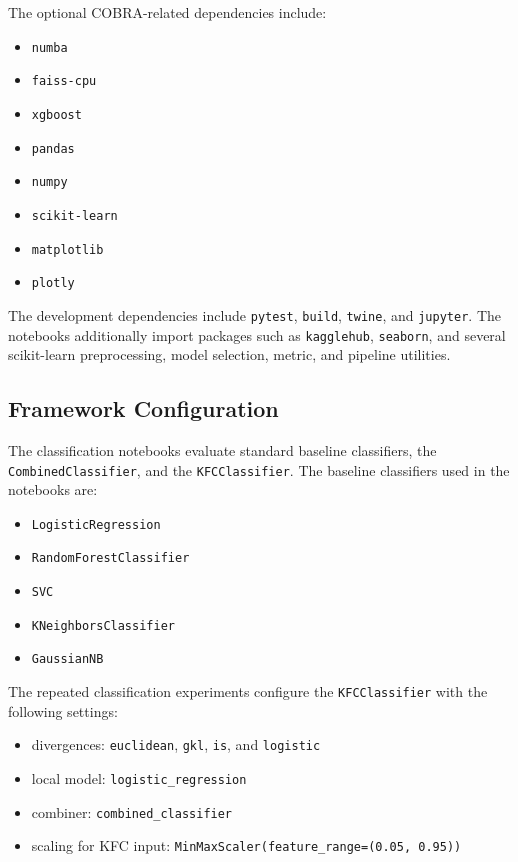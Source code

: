 The optional COBRA-related dependencies include:

\begin{itemize}
    \item \texttt{numba}
    \item \texttt{faiss-cpu}
    \item \texttt{xgboost}
    \item \texttt{pandas}
    \item \texttt{numpy}
    \item \texttt{scikit-learn}
    \item \texttt{matplotlib}
    \item \texttt{plotly}
\end{itemize}

The development dependencies include \texttt{pytest}, \texttt{build}, \texttt{twine}, and \texttt{jupyter}. The notebooks additionally import packages such as \texttt{kagglehub}, \texttt{seaborn}, and several scikit-learn preprocessing, model selection, metric, and pipeline utilities.

\subsection{Framework Configuration}

The classification notebooks evaluate standard baseline classifiers, the \texttt{CombinedClassifier}, and the \texttt{KFCClassifier}. The baseline classifiers used in the notebooks are:

\begin{itemize}
    \item \texttt{LogisticRegression}
    \item \texttt{RandomForestClassifier}
    \item \texttt{SVC}
    \item \texttt{KNeighborsClassifier}
    \item \texttt{GaussianNB}
\end{itemize}

The repeated classification experiments configure the \texttt{KFCClassifier} with the following settings:

\begin{itemize}
    \item divergences: \texttt{euclidean}, \texttt{gkl}, \texttt{is}, and \texttt{logistic}
    \item local model: \texttt{logistic\_regression}
    \item combiner: \texttt{combined\_classifier}
    \item scaling for KFC input: \texttt{MinMaxScaler(feature\_range=(0.05, 0.95))}
\end{itemize}

